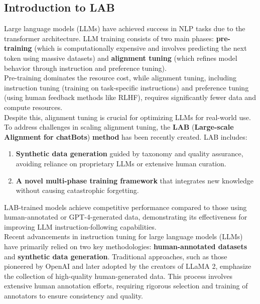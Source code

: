\documentclass[12pt]{article}
\begin{document}
\subsection{Introduction to LAB}
Large language models (LLMs) have achieved success in NLP tasks due to the transformer architecture. LLM training consists of two main phases: \textbf{pre-training} (which is computationally expensive and involves predicting the next token using massive datasets) and \textbf{alignment tuning} (which refines model behavior through instruction and preference tuning).\vspace{14pt}\\
Pre-training dominates the resource cost, while alignment tuning, including instruction tuning (training on task-specific instructions) and preference tuning (using human feedback methods like RLHF), requires significantly fewer data and compute resources.\\
Despite this, alignment tuning is crucial for optimizing LLMs for real-world use.\vspace{14pt}\\
To address challenges in scaling alignment tuning, the \textbf{LAB} (\textbf{Large-scale Alignment for chatBots}\cite{sudalairaj2024lablargescalealignmentchatbots}) \textbf{method} has been recently created. LAB includes:
\begin{enumerate}
    \item \textbf{Synthetic data generation} guided by taxonomy and quality assurance, avoiding reliance on proprietary LLMs or extensive human curation.  
    \item \textbf{A novel multi-phase training framework} that integrates new knowledge without causing catastrophic forgetting.
\end{enumerate}
LAB-trained models achieve competitive performance compared to those using human-annotated or GPT-4-generated data, demonstrating its effectiveness for improving LLM instruction-following capabilities.\vspace{14pt}\\
Recent advancements in instruction tuning for large language models (LLMs) have primarily relied on two key methodologies: \textbf{human-annotated datasets} and \textbf{synthetic data generation}. Traditional approaches, such as those pioneered by OpenAI and later adopted by the creators of LLaMA 2, emphasize the collection of high-quality human-generated data. This process involves extensive human annotation efforts, requiring rigorous selection and training of annotators to ensure consistency and quality.\vspace{14pt}\\
\end{document}
